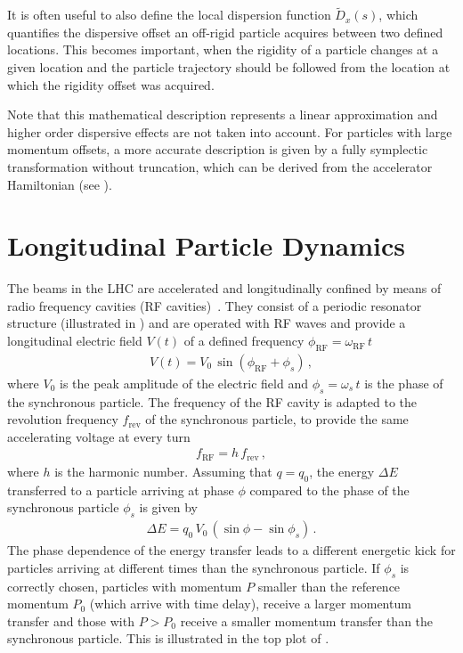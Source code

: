 It is often useful to also define the local dispersion function $\tilde{D}_x(s)$, which quantifies the dispersive offset an off-rigid particle acquires between two defined locations. This becomes important, when the rigidity of a particle changes at a given location and the particle trajectory should be followed from the location at which the rigidity offset was acquired.

Note that this mathematical description represents a linear approximation and higher order dispersive effects are not taken into account. For particles with large momentum offsets, a more accurate description is given by a fully symplectic transformation without truncation, which can be derived from the accelerator Hamiltonian (see ). 



\section{Longitudinal Particle Dynamics}



The beams in the LHC are accelerated and longitudinally confined by means of radio frequency cavities (RF cavities)~\cite{wiedemann1999particle}. They consist of a periodic resonator structure (illustrated in ) and are operated with RF waves and provide a longitudinal electric field $V(t)$ of a defined frequency $\phi_\text{RF} = \omega_\text{RF} \, t$
%
\begin{align}
  V(t) = V_0 \, \sin (\phi_\text{RF} + \phi_s) \, ,
\end{align}
%
where $V_0$ is the peak amplitude of the electric field and $\phi_s = \omega_s \, t$ is the phase of the synchronous particle. The frequency of the RF cavity is adapted to the revolution frequency $f_\text{rev}$ of the synchronous particle, to provide the same accelerating voltage at every turn
%
\begin{align}
  f_\text{RF} = h \, f_\text{rev} \, ,
\end{align}
%
where $h$ is the harmonic number. Assuming that $q=q_0$, the energy $\Delta E$ transferred to a particle arriving at phase $\phi$ compared to the phase of the synchronous particle $\phi_s$ is given by~\cite{CAS2013}
%
\begin{align}
  \Delta E =  q_0 \, V_0 \, \left( \sin \phi - \sin \phi_s \right) \, .
\end{align}
%
The phase dependence of the energy transfer leads to a different energetic kick for particles arriving at different times than the synchronous particle. If $\phi_s$ is correctly chosen, particles with momentum $P$ smaller than the reference momentum $P_0$ (which arrive with time delay), receive a larger momentum transfer and those with $P>P_0$ receive a smaller momentum transfer than the synchronous particle. This is illustrated in the top plot of . 

